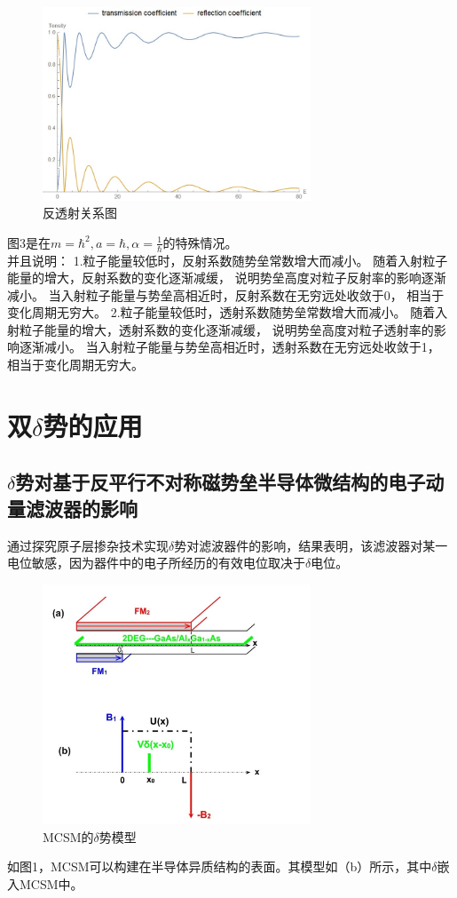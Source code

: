 \documentclass[12pt, a4paper, oneside]{ctexart}
\begin{document}
\begin{spacing}{2.0}
\begin{figure}[htbp]
    \centering
    \includegraphics[width=8cm]{transreflect.jpg}
    \caption{反透射关系图}
\end{figure}
图3是在$m=\hbar^2,a=\hbar,\alpha=\frac{1}{\hbar}$的特殊情况。\\
并且说明：
1.粒子能量较低时，反射系数随势垒常数增大而减小。
随着入射粒子能量的增大，反射系数的变化逐渐减缓，
说明势垒高度对粒子反射率的影响逐渐减小。
当入射粒子能量与势垒高相近时，反射系数在无穷远处收敛于0，
相当于变化周期无穷大。
2.粒子能量较低时，透射系数随势垒常数增大而减小。
随着入射粒子能量的增大，透射系数的变化逐渐减缓，
说明势垒高度对粒子透射率的影响逐渐减小。
当入射粒子能量与势垒高相近时，透射系数在无穷远处收敛于1，
相当于变化周期无穷大。\cite{key}
\section{双$\delta$势的应用}
\subsection{$\delta$势对基于反平行不对称磁势垒半导体微结构的电子动量滤波器的影响}
\cite{QIN2021127571}通过探究原子层掺杂技术实现$\delta$势对滤波器件的影响，结果表明，该滤波器对某一电位敏感，因为器件中的电子所经历的有效电位取决于$\delta$电位。
	
\begin{figure}[htbp]
	\centering
	\includegraphics[width=8cm]{alpha123.jpg}
	\caption{MCSM的$\delta$势模型}
\end{figure}
如图1，MCSM可以构建在半导体异质结构的表面。其模型如（b）所示，其中$\delta$嵌入MCSM中。
	

\end{spacing}
\end{document}
